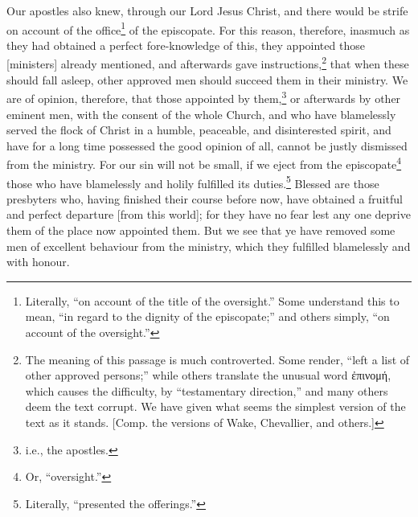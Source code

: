 
Our apostles also knew, through our Lord Jesus Christ, and there would be strife on account of the office\footnote{Literally, “on account of the title of the oversight.” Some understand this to mean, “in regard to the dignity of the episcopate;” and others simply, “on account of the oversight.”} of the episcopate. For this reason, therefore, inasmuch as they had obtained a perfect fore-knowledge of this, they appointed those [ministers] already mentioned, and afterwards gave instructions,\footnote{The meaning of this passage is much controverted. Some render, “left a list of other approved persons;” while others translate the unusual word \textgreek{ἐπινομή}, which causes the difficulty, by “testamentary direction,” and many others deem the text corrupt. We have given what seems the simplest version of the text as it stands. [Comp. the versions of Wake, Chevallier, and others.]} that when these should fall asleep, other approved men should succeed them in their ministry. We are of opinion, therefore, that those appointed by them,\footnote{i.e., the apostles.} or afterwards by other eminent men, with the consent of the whole Church, and who have blamelessly served the flock of Christ in a humble, peaceable, and disinterested spirit, and have for a long time possessed the good opinion of all, cannot be justly dismissed from the ministry. For our sin will not be small, if we eject from the episcopate\footnote{Or, “oversight.”} those who have blamelessly and holily fulfilled its duties.\footnote{Literally, “presented the offerings.”} Blessed are those presbyters who, having finished their course before now, have obtained a fruitful and perfect departure [from this world]; for they have no fear lest any one deprive them of the place now appointed them. But we see that ye have removed some men of excellent behaviour from the ministry, which they fulfilled blamelessly and with honour.


